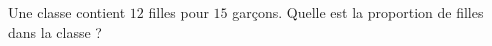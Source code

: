 
\begin{exercice}\label{exosmath-0856}

    Une classe contient \( 12\) filles pour \( 15\) garçons. Quelle est la proportion de filles dans la classe ?

\end{exercice}
